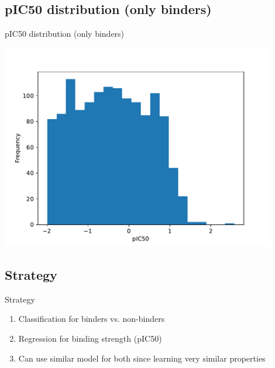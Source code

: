 \documentclass{beamer}
\begin{document}
\subsection{pIC50 distribution (only binders)}
\begin{frame}{pIC50 distribution (only binders)}

\includegraphics[width=0.9\textwidth]{../outputs/ic50_binders_distribution.pdf}
    
\end{frame}
    

\subsection{Strategy}
\begin{frame}{Strategy}

\begin{enumerate}
    \item Classification for binders vs. non-binders
    \item Regression for binding strength (pIC50)
    \item Can use similar model for both since learning very similar properties
\end{enumerate}
    
\end{frame}
    
\end{document}
